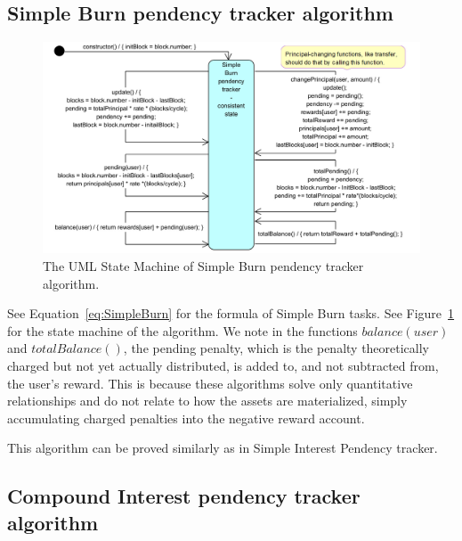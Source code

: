\documentclass{article}
\begin{document}
\subsection{Simple Burn pendency tracker algorithm}
\label{sec:SimpleBurnPendency}

\begin{figure}[H]
  \centering
  \includegraphics[width=5.3in]{images/SimpleBurnPendency.jpg}
  \caption{The UML State Machine of Simple Burn pendency tracker algorithm.
  }
  \label{fig:SimpleBurnPendency}
\end{figure}
See Equation~\ref{eq:SimpleBurn} for the formula of Simple Burn tasks.
See Figure~\ref{fig:SimpleBurnPendency} for the state machine of the 
algorithm.
\newline
We note in the functions $balance(user)$ and $totalBalance()$, the pending penalty,
which is the penalty theoretically charged but not yet actually distributed, 
is added to, and not subtracted from, the user's reward. 
This is because these algorithms solve only quantitative relationships and do 
not relate to how the assets are materialized, simply accumulating charged penalties 
into the negative reward account.

This algorithm can be proved similarly as in Simple Interest Pendency tracker.

\subsection{Compound Interest pendency tracker algorithm}
\label{sec:CompoundInterestPendency}
\end{document}
